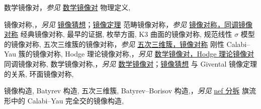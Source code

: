 \begin{theindex}
\subitem \leavevmode\hypertarget{idx:0828}{数学镜像对}，\textit{参见} \hyperlink{idx:0748}{数学镜像对}
\subitem \leavevmode\hypertarget{idx:0829}{物理定义},\enspace{}
\indexspace
\item \leavevmode\hypertarget{idx:0830}{镜像对称},\enspace{}，\textit{另见} \hyperlink{idx:0786}{镜像猜想}；\hyperlink{idx:0844}{镜像定理}
\subitem \leavevmode\hypertarget{idx:0831}{范畴镜像对称}，\textit{参见} \hyperlink{idx:0840}{镜像对称，同调镜像对称}
\subitem \leavevmode\hypertarget{idx:0832}{经典镜像对称},\enspace{}
\subitem \leavevmode\hypertarget{idx:0833}{最早的证据},\enspace{}
\subitem \leavevmode\hypertarget{idx:0834}{枚举方面},\enspace{}
\subitem \leavevmode\hypertarget{idx:0835}{K3 曲面的镜像对称},\enspace{}
\subitem \leavevmode\hypertarget{idx:0836}{规范线性 $\sigma$ 模型的镜像对称},\enspace{}
\subitem \leavevmode\hypertarget{idx:0837}{五次三维簇的镜像对称}，\textit{参见} \hyperlink{idx:1197}{五次三维簇，镜像对称}
\subitem \leavevmode\hypertarget{idx:0838}{刚性 Calabi--Yau 簇的镜像对称},\enspace{}
\subitem \leavevmode\hypertarget{idx:0839}{Hodge 理论镜像对称},\enspace{}，\textit{另见} \hyperlink{idx:0754}{数学镜像对，Hodge 理论镜像对}
\subitem \leavevmode\hypertarget{idx:0840}{同调镜像对称},\enspace{}
\subitem \leavevmode\hypertarget{idx:0841}{数学镜像对称},\enspace{}，\textit{另见} \hyperlink{idx:0748}{数学镜像对}；\hyperlink{idx:0786}{镜像猜想}
\subitem \leavevmode\hypertarget{idx:0842}{与 Givental 镜像定理的关系},\enspace{}
\subitem \leavevmode\hypertarget{idx:0843}{环面镜像对称},\enspace{}
\indexspace
\item \leavevmode\hypertarget{idx:0798}{镜像构造},\enspace{}
\subitem \leavevmode\hypertarget{idx:0799}{Batyrev 构造},\enspace{}
\subsubitem \leavevmode\hypertarget{idx:0800}{五次三维簇},\enspace{}
\subitem \leavevmode\hypertarget{idx:0801}{Batyrev--Borisov 构造},\enspace{}，\textit{另见} \hyperlink{idx:0935}{nef 分拆}
\subitem \leavevmode\hypertarget{idx:0802}{旗流形中的 Calabi--Yau 完全交的镜像构造},\enspace{}

\end{theindex}
